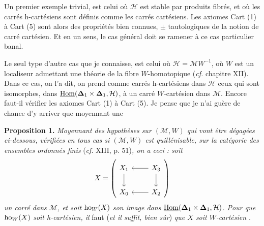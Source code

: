Un premier exemple trivial, est celui où $\mathcal{H}$ est stable par produits fibrés, et où les carrés h-cartésiens sont définis comme les carrés cartésiens. Les axiomes Cart (1) à Cart (5) sont alors des propriétés bien connues, $\pm$ tautologiques de la notion de carré cartésien. Et
en un sens, le cas général doit se ramener à ce cas particulier banal.

Le seul type d'autre cas que je connaisse, est celui où $\mathcal{H} = \mathcal{M}W^{-1}$, où $W$ est un localiseur admettant une théorie de la fibre $W$-homotopique (\textit{cf.} chapitre XII). Dans ce cas, on l'a dit, on prend comme carrés h-cartésiens dans $\mathcal{H}$ ceux qui sont isomorphes, dans $\underline{\operatorname{Hom}}(\boldsymbol{\Delta}_1 \times \boldsymbol{\Delta}_1, \mathcal{H})$, à un carré $W$-cartésien dans $\mathcal{M}$. Encore faut-il vérifier les axiomes Cart (1) à Cart (5). Je pense que je n'ai guère de chance d'y arriver que moyennant une

\textbf{Proposition 1.} \textit{Moyennant des hypothèses sur $(\mathcal{M}, W)$ qui vont être dégagées ci-dessous, vérifiées en tous cas si $(\mathcal{M}, W)$ est quillénisable, sur la catégorie des ensembles ordonnés finis} (\textit{cf.} XIII, p. 51)\textit{, on a ceci : soit}
\[
X = \left(\begin{tikzcd}
X_1 \ar[d] & X_3 \ar[l] \ar[d] \\
X_0 & X_2 \ar[l]
\end{tikzcd}\right)
\]
\textit{un carré dans $\mathcal{M}$, et soit} $\mathrm{ho}_W(X)$ \textit{son image dans} $\underline{\operatorname{Hom}}(\boldsymbol{\Delta}_1 \times \boldsymbol{\Delta}_1, \mathcal{H})$\textit{. Pour que} $\mathrm{ho}_W(X)$ \textit{soit h-cartésien, il} faut (\textit{et il suffit, bien sûr}) \textit{que $X$ soit $W$-cartésien} \textit{.}

